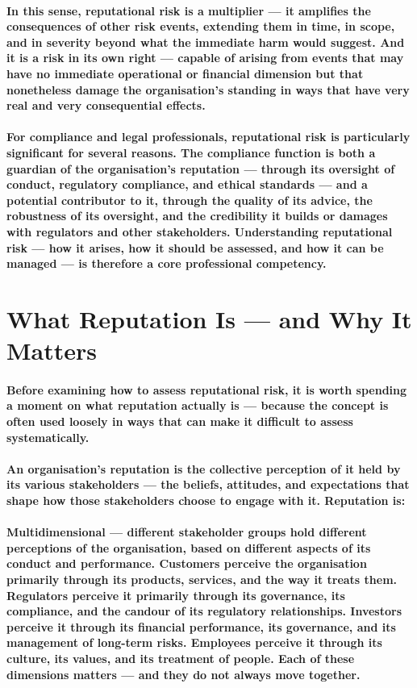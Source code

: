 \paragraph{In this sense, reputational risk is a \textbf{multiplier} — it amplifies the consequences of other risk events, extending them in time, in scope, and in severity beyond what the immediate harm would suggest. And it is a risk in its own right — capable of arising from events that may have no immediate operational or financial dimension but that nonetheless damage the organisation's standing in ways that have very real and very consequential effects.}
\paragraph{For compliance and legal professionals, reputational risk is particularly significant for several reasons. The compliance function is both a guardian of the organisation's reputation — through its oversight of conduct, regulatory compliance, and ethical standards — and a potential contributor to it, through the quality of its advice, the robustness of its oversight, and the credibility it builds or damages with regulators and other stakeholders. Understanding reputational risk — how it arises, how it should be assessed, and how it can be managed — is therefore a core professional competency.}

\section{What Reputation Is — and Why It Matters}
\paragraph{Before examining how to assess reputational risk, it is worth spending a moment on what reputation actually is — because the concept is often used loosely in ways that can make it difficult to assess systematically.}
\paragraph{An organisation's reputation is the collective perception of it held by its various stakeholders — the beliefs, attitudes, and expectations that shape how those stakeholders choose to engage with it. Reputation is:}
\paragraph{\textbf{Multidimensional} — different stakeholder groups hold different perceptions of the organisation, based on different aspects of its conduct and performance. Customers perceive the organisation primarily through its products, services, and the way it treats them. Regulators perceive it primarily through its governance, its compliance, and the candour of its regulatory relationships. Investors perceive it through its financial performance, its governance, and its management of long-term risks. Employees perceive it through its culture, its values, and its treatment of people. Each of these dimensions matters — and they do not always move together.}
